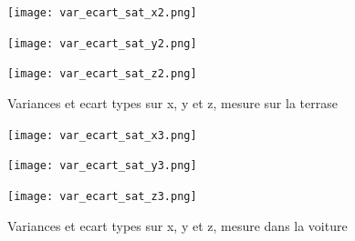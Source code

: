 \documentclass[a4paper,12pt]{article}
\begin{document}
\newpage

\begin{figure}[htbp] 
  \label{ fig3} 
  \begin{minipage}[b]{0.5\linewidth}
    \centering
    \texttt{[image: var\_ecart\_sat\_x2.png]} 
    
    \vspace{4ex}
  \end{minipage}%
  \begin{minipage}[b]{0.5\linewidth}
    \centering
    \texttt{[image: var\_ecart\_sat\_y2.png]} 
    \vspace{4ex}
  \end{minipage} 
  \begin{minipage}[b]{0.5\linewidth}
    \centering
    \texttt{[image: var\_ecart\_sat\_z2.png]} 
    \vspace{4ex}
  \end{minipage}%
   \caption{Variances et ecart types sur x, y et z, mesure sur la terrase} 
\end{figure}

\newpage

\begin{figure}[htbp] 
  \label{ fig3} 
  \begin{minipage}[b]{0.5\linewidth}
    \centering
    \texttt{[image: var\_ecart\_sat\_x3.png]} 
    
    \vspace{4ex}
  \end{minipage}%
  \begin{minipage}[b]{0.5\linewidth}
    \centering
    \texttt{[image: var\_ecart\_sat\_y3.png]} 
    \vspace{4ex}
  \end{minipage} 
  \begin{minipage}[b]{0.5\linewidth}
    \centering
    \texttt{[image: var\_ecart\_sat\_z3.png]} 
    \vspace{4ex}
  \end{minipage}%
   \caption{Variances et ecart types sur x, y et z, mesure dans la voiture} 
\end{figure}

\newpage
\end{document}
